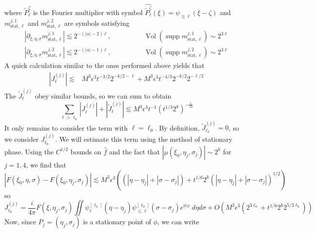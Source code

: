 \documentclass[letterpaper, reqno,final]{amsart}
\DeclareMathOperator{\supp}{supp}
\DeclareMathOperator{\Vol}{Vol}
\newcommand{\bigO}[1]{O\left({#1}\right)}
\begin{document}
where $\tilde{P}^\zeta_{\ell}$ is the Fourier multiplier with symbol $\widehat{\tilde{P}^\zeta_{\ell}}(\xi) = \psi_{\lesssim \ell}(\xi - \zeta)$ and $m^{j,1}_{\text{stat},\ell}$ and $m^{j,2}_{\text{stat},\ell}$ are symbols satisfying
\begin{equation*}\begin{split}
    |\partial_{\xi,\eta,\sigma} m^{j,1}_{\text{stat},\ell}| \lesssim 2^{-(|\alpha| - 2)\ell},&\qquad\qquad \Vol(\supp m^{j,1}_{\text{stat},\ell}) \sim 2^{3\ell}\\
    |\partial_{\xi,\eta,\sigma} m^{j,2}_{\text{stat},\ell}| \lesssim 2^{-(|\alpha| - 1)\ell},&\qquad\qquad \Vol(\supp m^{j,2}_{\text{stat},\ell}) \sim 2^{3\ell}
\end{split}\end{equation*}
A quick calculation similar to the ones performed above yields that
\begin{equation*}\begin{split}
    |J^{(j)}_\ell| \lesssim& M^3\epsilon^3 t^{-3/2}2^{-k/2-\ell} +  M^3\epsilon^3 t^{-4/3} 2^{-k/2} 2^{-\ell/2}
\end{split}\end{equation*}
The $\tilde{J}^{(j)}_\ell$ obey similar bounds, so we can sum to obtain
\begin{equation*}
    \sum_{\ell > \ell_0} |J^{(j)}_\ell| + |\tilde{J}^{(j)}_\ell| \lesssim M^3\epsilon^3 t^{-1} (t^{1/3}2^k)^{-\frac{1}{52}}
\end{equation*}
It only remains to consider the term with $\ell = \ell_0$.  By definition, $\tilde{J}^{(j)}_{\ell_0} = 0$, so we consider $J^{(j)}_{\ell_0}$.  We will estimate this term using the method of stationary phase.  Using the $C^{1/2}$ bounds on $\hat{f}$ and the fact that ${|\mu(\xi_0, \eta_j, \sigma_j)| \sim 2^k}$ for $j = 1,4$,	we find that
\begin{equation*}
    |F(\xi_0,\eta,\sigma) - F(\xi_0, \eta_j, \sigma_j)| \lesssim M^3 \epsilon^3 \left((|\eta - \eta_j| + |\sigma - \sigma_j|) +  t^{1/6}2^k (|\eta - \eta_j| + |\sigma - \sigma_j|)^{1/2}\right)
\end{equation*}
so
\begin{equation*}
    J^{(j)}_{\ell_0} = \frac{i}{4\pi}F(\xi,\eta_j, \sigma_j) \iint \psi^{[\ell_0]}_{\ell}(\eta - \eta_j) \psi^{[\ell_0]}_{\leq \ell}(\sigma - \sigma_j) e^{it\phi} \;d\eta d\sigma + \bigO{M^3\epsilon^3\left(2^{3\ell_0} + t^{1/6}2^k 2^{5/2\ell_0}\right)}
\end{equation*}
Now, since $P_j = (\eta_j, \sigma_j)$ is a stationary point of $\phi$, we can write
\end{document}
